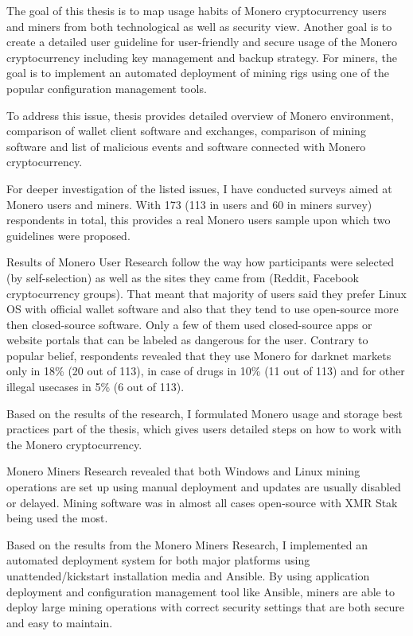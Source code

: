 \documentclass[
  printed, %
  table,   %
  lof,     %
  lot,     %
           oneside, color
]{fithesis3}
\begin{document}
The goal of this thesis is to map usage habits of Monero cryptocurrency users and miners from both technological as well as security view. Another goal is to create a detailed user guideline for user-friendly and secure usage of the Monero cryptocurrency including key management and backup strategy. For miners, the goal is to implement an automated deployment of mining rigs using one of the popular configuration management tools.

To address this issue, thesis provides detailed overview of Monero environment, comparison of wallet client software and exchanges, comparison of mining software and list of malicious events and software connected with Monero cryptocurrency.

For deeper investigation of the listed issues, I have conducted surveys aimed at Monero users and miners. With 173 (113 in users and 60 in miners survey) respondents in total, this provides a real Monero users sample upon which two guidelines were proposed. %

Results of Monero User Research follow the way how participants were selected (by self-selection) as well as the sites they came from (Reddit, Facebook cryptocurrency groups). That meant that majority of users said they prefer Linux OS with official wallet software and also that they tend to use open-source more then closed-source software. Only a few of them used closed-source apps or website portals that can be labeled as dangerous for the user. Contrary to popular belief, respondents revealed that they use Monero for darknet markets only in 18\% (20 out of 113), in case of drugs in 10\% (11 out of 113) and for other illegal usecases in 5\% (6 out of 113).

Based on the results of the research, I formulated Monero usage and storage best practices part of the thesis, which gives users detailed steps on how to work with the Monero cryptocurrency.

Monero Miners Research revealed that both Windows and Linux mining operations are set up using manual deployment and updates are usually disabled or delayed. Mining software was in almost all cases open-source with XMR Stak being used the most. 

Based on the results from the Monero Miners Research, I implemented an automated deployment system for both major platforms using unattended/kickstart installation media and Ansible. By using application deployment and configuration management tool like Ansible, miners are able to deploy large mining operations with correct security settings that are both secure and easy to maintain. 
\end{document}
